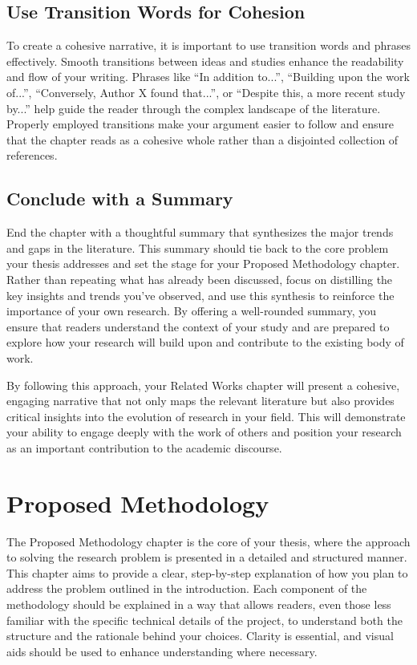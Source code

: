 \documentclass{iutbscthesis}
\begin{document}
\section{Use Transition Words for Cohesion}
To create a cohesive narrative, it is important to use transition words and phrases effectively. Smooth transitions between ideas and studies enhance the readability and flow of your writing. Phrases like ``In addition to...'', ``Building upon the work of...'', ``Conversely, Author X found that...'', or ``Despite this, a more recent study by...'' help guide the reader through the complex landscape of the literature. Properly employed transitions make your argument easier to follow and ensure that the chapter reads as a cohesive whole rather than a disjointed collection of references.

\section{Conclude with a Summary}
End the chapter with a thoughtful summary that synthesizes the major trends and gaps in the literature. This summary should tie back to the core problem your thesis addresses and set the stage for your Proposed Methodology chapter. Rather than repeating what has already been discussed, focus on distilling the key insights and trends you’ve observed, and use this synthesis to reinforce the importance of your own research. By offering a well-rounded summary, you ensure that readers understand the context of your study and are prepared to explore how your research will build upon and contribute to the existing body of work.

By following this approach, your Related Works chapter will present a cohesive, engaging narrative that not only maps the relevant literature but also provides critical insights into the evolution of research in your field. This will demonstrate your ability to engage deeply with the work of others and position your research as an important contribution to the academic discourse.

\chapter{Proposed Methodology} \label{chapter:proposed}
The Proposed Methodology chapter is the core of your thesis, where the approach to solving the research problem is presented in a detailed and structured manner. This chapter aims to provide a clear, step-by-step explanation of how you plan to address the problem outlined in the introduction. Each component of the methodology should be explained in a way that allows readers, even those less familiar with the specific technical details of the project, to understand both the structure and the rationale behind your choices. Clarity is essential, and visual aids should be used to enhance understanding where necessary.
\end{document}
